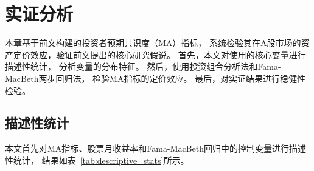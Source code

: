 
\chapter{实证分析}

本章基于前文构建的投资者预期共识度（MA）指标，
系统检验其在A股市场的资产定价效应，验证前文提出的核心研究假说。
首先，本文对使用的核心变量进行描述性统计，
分析变量的分布特征。
然后，使用投资组合分析法和Fama-MacBeth两步回归法，
检验MA指标的定价效应。
最后，对实证结果进行稳健性检验。

\section{描述性统计}

本文首先对MA指标、股票月收益率和Fama-MacBeth回归中的控制变量进行描述性统计，
结果如表~\ref{tab:descriptive_stats}所示。

